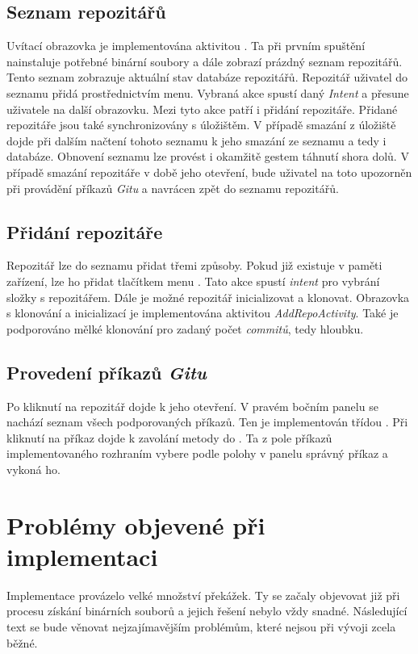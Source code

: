     \subsection{Seznam repozitářů}
    Uvítací obrazovka je implementována aktivitou . Ta při prvním spuštění nainstaluje potřebné binární soubory a dále zobrazí prázdný seznam repozitářů. Tento seznam zobrazuje aktuální stav databáze repozitářů. Repozitář uživatel do seznamu přidá prostřednictvím menu. Vybraná akce spustí daný \emph{Intent} a přesune uživatele na další obrazovku. Mezi tyto akce patří i přidání  repozitáře. Přidané repozitáře jsou také synchronizovány s úložištěm. V případě smazání z úložiště dojde při dalším načtení tohoto seznamu k jeho smazání ze seznamu a tedy i databáze. Obnovení seznamu lze provést i okamžitě gestem táhnutí shora dolů. V případě smazání repozitáře v době jeho otevření, bude uživatel na toto upozorněn při provádění příkazů \emph{Gitu} a navrácen zpět do seznamu repozitářů. 

    \subsection{Přidání repozitáře}
    Repozitář lze do seznamu přidat třemi způsoby. Pokud již existuje v paměti zařízení, lze ho přidat tlačítkem menu . Tato akce spustí \emph{intent} pro vybrání složky s repozitářem. Dále je možné repozitář inicializovat a klonovat. Obrazovka s klonování a inicializací je implementována aktivitou \emph{AddRepoActivity}. Také je podporováno mělké klonování pro zadaný počet \emph{commitů}, tedy hloubku. 

    \subsection{Provedení příkazů \emph{Gitu}}
    Po kliknutí na repozitář dojde k jeho otevření. V pravém bočním panelu se nachází seznam všech podporovaných příkazů. Ten je implementován třídou . Při kliknutí na příkaz dojde k zavolání metody  do . Ta z pole příkazů implementovaného rozhraním  vybere podle polohy v panelu správný příkaz a vykoná ho.

\section{Problémy objevené při implementaci}\label{sec:problemy_implem}
Implementace provázelo velké množství překážek. Ty se začaly objevovat již při procesu získání binárních souborů a jejich řešení nebylo vždy snadné. Následující text se bude věnovat nejzajímavějším problémům, které nejsou při vývoji zcela běžné.

